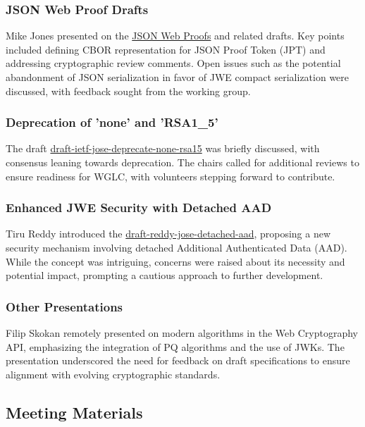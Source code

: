\documentclass{article}
\begin{document}
\subsubsection{JSON Web Proof Drafts}

Mike Jones presented on the \href{https://datatracker.ietf.org/doc/html/draft-ietf-jose-json-web-proof}{JSON Web Proofs} and related drafts. Key points included defining CBOR representation for JSON Proof Token (JPT) and addressing cryptographic review comments. Open issues such as the potential abandonment of JSON serialization in favor of JWE compact serialization were discussed, with feedback sought from the working group.

\subsubsection{Deprecation of 'none' and 'RSA1\_5'}

The draft \href{https://datatracker.ietf.org/doc/html/draft-ietf-jose-deprecate-none-rsa15}{draft-ietf-jose-deprecate-none-rsa15} was briefly discussed, with consensus leaning towards deprecation. The chairs called for additional reviews to ensure readiness for WGLC, with volunteers stepping forward to contribute.

\subsubsection{Enhanced JWE Security with Detached AAD}

Tiru Reddy introduced the \href{https://datatracker.ietf.org/doc/html/draft-reddy-jose-detached-aad}{draft-reddy-jose-detached-aad}, proposing a new security mechanism involving detached Additional Authenticated Data (AAD). While the concept was intriguing, concerns were raised about its necessity and potential impact, prompting a cautious approach to further development.

\subsubsection{Other Presentations}

Filip Skokan remotely presented on modern algorithms in the Web Cryptography API, emphasizing the integration of PQ algorithms and the use of JWKs. The presentation underscored the need for feedback on draft specifications to ensure alignment with evolving cryptographic standards.

\subsection{Meeting Materials}
\end{document}
